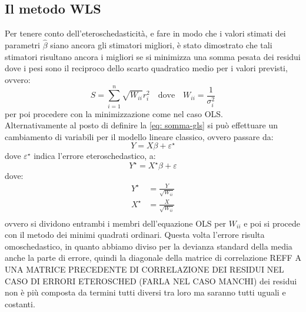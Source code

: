 \subsection{Il metodo WLS}
Per tenere conto dell'eteroschedasticità, e fare in modo che i valori stimati dei parametri $\hat{\beta}$ siano ancora gli stimatori migliori, è stato dimostrato che tali stimatori risultano ancora i migliori se si minimizza una somma pesata dei residui dove i pesi sono il reciproco dello scarto quadratico medio per i valori previsti, ovvero:
\begin{equation}
S = \sum_{i=1}^{n} \sqrt{W_{ii}} r_i^2 \quad \text{dove}\quad W_{ii} = \frac{1}{\sigma_i^2} 
\label{eq: somma-gls}
\end{equation}
per poi procedere con la minimizzazione come nel caso OLS. \\
Alternativamente al posto di definire la \eqref{eq: somma-gls} si può effettuare un cambiamento di variabili per il modello lineare classico, ovvero passare da:
\begin{equation}
Y = X\beta + \varepsilon^\star
\label{eq: regressione-lineare-eterosched}
\end{equation} 
dove $\varepsilon^\star$ indica l'errore eteroschedastico, a:
\begin{equation}
Y^\star = X^\star\beta + \varepsilon
\end{equation}
dove:
\begin{equation}
\begin{split}
Y^\star &= \frac{Y}{\sqrt{W_{ii}}} \\
X^\star &= \frac{X}{\sqrt{W_{ii}}} \\
\end{split}
\end{equation}
ovvero si dividono entrambi i membri dell'equazione OLS per $W_{ii}$ e poi si procede con il metodo dei minimi quadrati ordinari. Questa volta l'errore risulta omoschedastico, in quanto abbiamo diviso per la devianza standard della media anche la parte di errore, quindi la diagonale della matrice di correlazione REFF A UNA MATRICE PRECEDENTE DI CORRELAZIONE DEI RESIDUI NEL CASO DI ERRORI ETEROSCHED (FARLA NEL CASO MANCHI) dei residui non è più composta da termini tutti diversi tra loro ma saranno tutti uguali e costanti.
